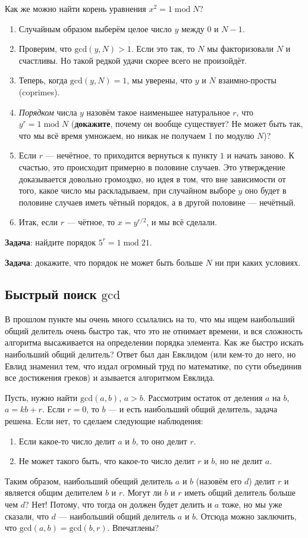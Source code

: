 \documentclass[12pt]{article}
\begin{document}
Как же можно найти корень уравнения $x^2 = 1\;\mbox{mod}\;N$? 
\begin{enumerate}
\item Случайным образом выберём целое число $y$ между $0$ и $N - 1$. 
\item Проверим, что $\mbox{gcd}(y, N) > 1$. Если это так, то $N$ мы факторизовали $N$ и счастливы. Но такой редкой удачи скорее всего не произойдёт.
\item Теперь, когда $\mbox{gcd}(y, N) = 1$, мы уверены, что $y$ и $N$ взаимно-просты (coprimes). 
\item {\it Порядком} числа $y$ назовём такое наименьшее натуральное $r$, что $y^r = 1\;\mbox{mod}\;N$ ({\bf докажите}, почему он вообще существует? Не может быть так, что мы всё время умножаем, но никак не получаем 1 по модулю $N$)?
\item Если $r$ --- нечётное, то приходится вернуться к пункту $1$ и начать заново. К счастью, это происходит примерно в половине случаев. Это утверждение доказывается довольно громоздко, но идея в том, что вне зависимости от того, какое число мы раскладываем, при случайном выборе $y$ оно будет в половине случаев иметь чётный порядок, а в другой половине --- нечётный.
\item Итак, если $r$ --- чётное, то $x = y^{r / 2}$, и мы всё сделали.
\end{enumerate}

{\bf Задача}: найдите порядок $5^r = 1\;\mbox{mod}\;21$.

{\bf Задача}: докажите, что порядок не может быть больше $N$ ни при каких условиях.

\subsection*{Быстрый поиск $\mbox{gcd}$}
В прошлом пункте мы очень много ссылались на то, что мы ищем наибольший общий делитель очень быстро так, что это не отнимает времени, и вся сложность алгоритма высаживается на определении порядка элемента. Как же быстро искать наибольший общий делитель? Ответ был дан Евклидом (или кем-то до него, но Евлид знаменил тем, что издал огромный труд по математике, по сути объединив все достижения греков) и азывается алгоритмом Евклида.

Пусть, нужно найти $\mbox{gcd}(a, b)$, $a > b$. Рассмотрим остаток от деления $a$ на $b$, $a = k b + r$. Если $r = 0$, то $b$ --- и есть наибольший общий делитель, задача решена. Если нет, то сделаем следующие наблюдения:
\begin{enumerate}
\item Если какое-то число делит $a$ и $b$, то оно делит $r$.
\item Не может такого быть, что какое-то число делит $r$ и $b$, но не делит $a$.
\end{enumerate}
Таким образом, наибольший обещий делитель $a$ и $b$ (назовём его $d$) делит $r$ и является общим делителем $b$ и $r$. Могут ли $b$ и $r$ иметь общий делитель больше чем $d$? Нет! Потому, что тогда он должен будет делить и $a$ тоже, но мы уже сказали, что $d$ --- наибольший общий делитель $a$ и $b$. Отсюда можно заключить, что $\mbox{gcd}(a, b) = \mbox{gcd}(b, r)$. Впечатлены? 
\end{document}
